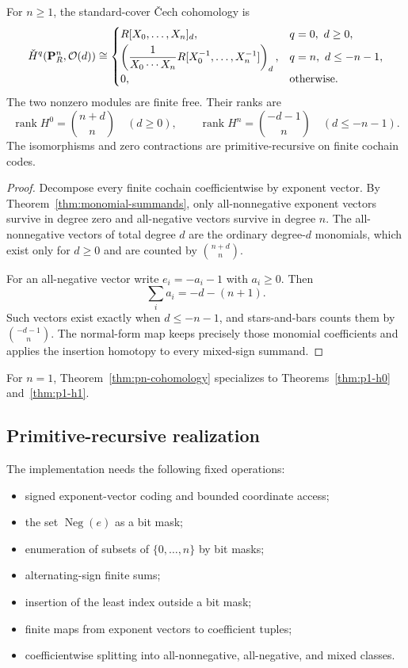 \begin{theorem}\label{thm:pn-cohomology}
For $n\geq1$, the standard-cover \v{C}ech cohomology is
\[
 \check H^q(\mathbf P^n_R,\mathcal O(d))\cong
 \begin{cases}
   R[X_0,\ldots,X_n]_d,& q=0,\ d\geq0,\\[0.2em]
   \displaystyle
   \left(\frac1{X_0\cdots X_n}
   R[X_0^{-1},\ldots,X_n^{-1}]\right)_d,& q=n,\ d\leq-n-1,\\[0.5em]
   0,&\text{otherwise.}
 \end{cases}
\]
The two nonzero modules are finite free.  Their ranks are
\[
    \operatorname{rank}H^0=\binom{n+d}{n}\quad(d\geq0),
    \qquad
    \operatorname{rank}H^n=\binom{-d-1}{n}\quad(d\leq-n-1).
\]
The isomorphisms and zero contractions are primitive-recursive on finite cochain codes.
\end{theorem}

\begin{proof}
Decompose every finite cochain coefficientwise by exponent vector.  By
Theorem~\ref{thm:monomial-summands}, only all-nonnegative exponent vectors survive in degree zero and
all-negative vectors survive in degree $n$.  The all-nonnegative vectors of total degree $d$ are the
ordinary degree-$d$ monomials, which exist only for $d\geq0$ and are counted by
$\binom{n+d}{n}$.

For an all-negative vector write $e_i=-a_i-1$ with $a_i\geq0$.  Then
\[
                   \sum_i a_i=-d-(n+1).
\]
Such vectors exist exactly when $d\leq-n-1$, and stars-and-bars counts them by
$\binom{-d-1}{n}$.  The normal-form map keeps precisely those monomial coefficients and applies the
insertion homotopy to every mixed-sign summand.
\end{proof}

For $n=1$, Theorem~\ref{thm:pn-cohomology} specializes to
Theorems~\ref{thm:p1-h0} and~\ref{thm:p1-h1}.

\subsection{Primitive-recursive realization}

The implementation needs the following fixed operations:

\begin{itemize}
\item signed exponent-vector coding and bounded coordinate access;
\item the set $\operatorname{Neg}(e)$ as a bit mask;
\item enumeration of subsets of $\{0,\ldots,n\}$ by bit masks;
\item alternating-sign finite sums;
\item insertion of the least index outside a bit mask;
\item finite maps from exponent vectors to coefficient tuples;
\item coefficientwise splitting into all-nonnegative, all-negative, and mixed classes.
\end{itemize}

